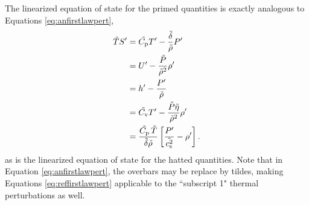 \documentclass[12pt]{article}
\newcommand{\vecf}{\bm{F}}
\begin{document}
The linearized equation of state for the primed quantities is exactly analogous to Equations \eqref{eq:anfirstlawpert},
  \begin{subequations}\label{eq:reffirstlawpert}
	\begin{align}
		\tilde{T} {S^\prime} &= \tilde{C_{\rm{p}}} {T^\prime} - \frac{\tilde{\delta}}{\tilde{\rho}} {P^\prime}\label{eq:reffirstlawperttmpprs}\\
		&= {U^\prime} - \frac{\tilde{P}}{\tilde{\rho}^2}{\rho^\prime} \label{eq:reffirstlawpertinterho}\\
		&= {h^\prime} - \frac{{P^\prime}}{\tilde{\rho}}\label{eq:reffirstlawwpthprs}\\
		&= \tilde{C_{\rm{v}}} {T^\prime} - \frac{\tilde{P}\tilde{\eta}}{\tilde{\rho}^2}{\rho^\prime}\label{eq:reffirstlawperttmprho}\\		
		&= \frac{\tilde{C_{\rm{p}}}\, \tilde{T}}{\tilde{\delta}\tilde{\rho}}\left[\frac{{P^\prime}}{\tilde{c_{\rm s}^2}}-{\rho^\prime}\right].\label{eq:reffirstlawpertprsrho}
	\end{align}
\end{subequations}
as is the linearized equation of state for the hatted quantities. Note that in Equation \eqref{eq:anfirstlawpert}, the overbars may be replace by tildes, making Equations \eqref{eq:reffirstlawpert} applicable to the ``subscript 1" thermal perturbations as well. 
\end{document}
